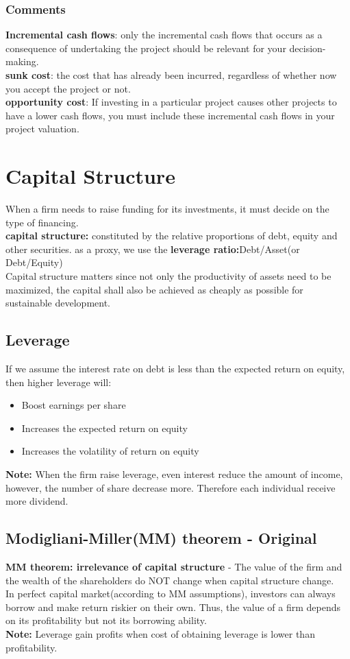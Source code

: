 \documentclass{article}
\theoremstyle{definition}
\theoremstyle{thrm}
\theoremstyle{lma}
\theoremstyle{ppst}
\theoremstyle{crlr}
\begin{document}
\subsubsection{Comments}
\textbf{Incremental cash flows}: only the incremental cash flows that occurs as a consequence of undertaking the project should be relevant for your decision-making.\\
\textbf{sunk cost}: the cost that has already been incurred, regardless of whether now you accept the project or not. \\
\textbf{opportunity cost}: If investing in a particular project causes other projects to have a lower cash flows, you must include these incremental cash flows in your project valuation. 

\section{Capital Structure}
When a firm needs to raise funding for its investments, it must decide on the type of financing. \\
\textbf{capital structure:} constituted by the relative proportions of debt, equity and other securities. as a proxy, we use the \textbf{leverage ratio:}Debt/Asset(or Debt/Equity)\\
Capital structure matters since not only the productivity of assets need to be maximized, the capital shall also be achieved as cheaply as possible for sustainable development. 
\subsection{Leverage}
If we assume the interest rate on debt is less than the expected return on equity, then higher leverage will:
\begin{itemize}
	\item Boost earnings per share
	\item Increases the expected return on equity
	\item Increases the volatility of return on equity
\end{itemize}
\textbf{Note: } When the firm raise leverage, even interest reduce the amount of income, however, the number of share decrease more. Therefore each individual receive more dividend. 

\subsection{Modigliani-Miller(MM) theorem - Original}
\textbf{MM theorem: irrelevance of capital structure} - The value of the firm and the wealth of the shareholders do NOT change when capital structure change. \\
In perfect capital market(according to MM assumptions), investors can always borrow and make return riskier on their own. Thus, the value of a firm depends on its profitability but not its borrowing ability. \\
\textbf{Note:} Leverage gain profits when cost of obtaining leverage is lower than profitability. 
\end{document}
